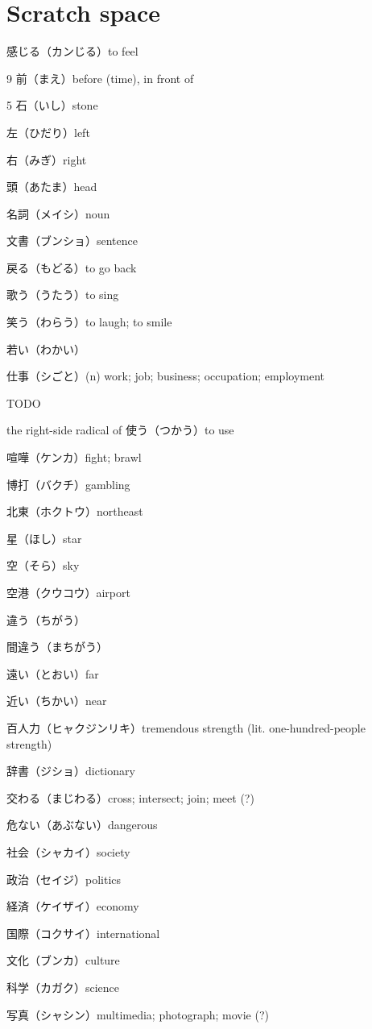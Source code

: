 \chapter{Scratch space}

感じる（カンじる）to feel

9 前（まえ）before (time), in front of

5 石（いし）stone

左（ひだり）left

右（みぎ）right

頭（あたま）head

名詞（メイシ）noun

文書（ブンショ）sentence

戻る（もどる）to go back

歌う（うたう）to sing

笑う（わらう）to laugh; to smile

若い（わかい）

仕事（シごと）(n) work; job; business; occupation; employment

TODO

the right-side radical of 使う（つかう）to use

喧嘩（ケンカ）fight; brawl

博打（バクチ）gambling

北東（ホクトウ）northeast

星（ほし）star

空（そら）sky

空港（クウコウ）airport

違う（ちがう）

間違う（まちがう）

遠い（とおい）far

近い（ちかい）near

百人力（ヒャクジンリキ）tremendous strength (lit. one-hundred-people strength)

辞書（ジショ）dictionary

交わる（まじわる）cross; intersect; join; meet (?)

危ない（あぶない）dangerous

社会（シャカイ）society

政治（セイジ）politics

経済（ケイザイ）economy

国際（コクサイ）international

文化（ブンカ）culture

科学（カガク）science

写真（シャシン）multimedia; photograph; movie (?)

